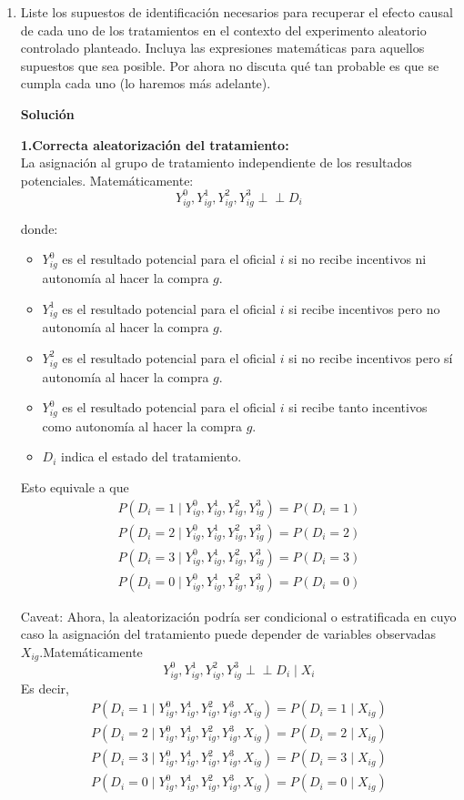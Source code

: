 \documentclass[a4paper, answers, addpoints, 11pt]{exam}
\newenvironment{solucion}{%
  \begin{mdframed}[
    backgroundcolor=blue!5,    %
    linecolor=blue!50,          %
    linewidth=2pt,              %
    leftmargin=10pt,            %
    rightmargin=10pt,           %
    topline=true,              %
    bottomline=true,            %
    roundcorner=10pt,           %
    innerleftmargin=10pt,       %
    innerrightmargin=10pt,      %
    innerbottommargin=10pt,     %
    innertopmargin=10pt         %
  ]%
  \begin{tcolorbox}[colframe=blue!50!black, colback=blue!50, coltitle=white, sharp corners=all, boxrule=1mm, width=\textwidth, halign=left, valign=center, top=0mm, bottom=0mm, left=0mm, right=0mm] \textbf{Solución} \end{tcolorbox} }{\end{mdframed}}
\begin{document}
\begin{enumerate}
    \item Liste los supuestos de identificación necesarios para recuperar el efecto causal de cada uno de los tratamientos en el contexto del experimento aleatorio controlado planteado. Incluya las expresiones matemáticas para aquellos supuestos que sea posible. Por ahora no discuta qué tan probable es que se cumpla cada uno (lo haremos más adelante). 
    \begin{solucion}
    \textbf{1.Correcta aleatorización del tratamiento:}\\
    La asignación al grupo de tratamiento independiente de los resultados potenciales. Matemáticamente:
   \[
Y_{ig}^0, Y_{ig}^1, Y_{ig}^2, Y_{ig}^3 \perp\!\!\!\perp D_i
\]

donde:
\begin{itemize}
    \item \( Y_{ig}^0 \) es el resultado potencial para el oficial \( i \) si no recibe incentivos ni autonomía al hacer la compra \( g \).
  \item \( Y_{ig}^1 \) es el resultado potencial para el oficial \( i \) si recibe incentivos pero no autonomía al hacer la compra \( g \).
  \item \( Y_{ig}^2 \) es el resultado potencial para el oficial \( i \) si no recibe incentivos pero sí autonomía al hacer la compra \( g \).
  \item \( Y_{ig}^0 \) es el resultado potencial para el oficial \( i \) si recibe tanto incentivos como autonomía al hacer la compra \( g \).
    \item \( D_i \) indica el estado del tratamiento.
\end{itemize}
Esto equivale a que \begin{gather*}
 P(D_i = 1 \mid Y_{ig}^0, Y_{ig}^1, Y_{ig}^2, Y_{ig}^3) = P(D_i = 1)\\
P(D_i = 2 \mid Y_{ig}^0, Y_{ig}^1, Y_{ig}^2, Y_{ig}^3) = P(D_i = 2)\\
P(D_i = 3 \mid Y_{ig}^0, Y_{ig}^1, Y_{ig}^2, Y_{ig}^3) = P(D_i = 3)\\
P(D_i = 0 \mid Y_{ig}^0, Y_{ig}^1, Y_{ig}^2, Y_{ig}^3) = P(D_i = 0)   
\end{gather*}

\begin{mdframed}[backgroundcolor=moraditoClaro]
Caveat: Ahora, la aleatorización podría ser condicional o estratificada en cuyo caso la asignación del tratamiento puede depender de variables observadas \(X_{ig}\).Matemáticamente \[
Y_{ig}^0, Y_{ig}^1, Y_{ig}^2, Y_{ig}^3 \perp\!\!\!\perp D_i \mid X_i
\]
Es decir,
\begin{gather*}
 P(D_i = 1 \mid Y_{ig}^0, Y_{ig}^1, Y_{ig}^2, Y_{ig}^3,X_{ig}) = P(D_i = 1\mid X_{ig})\\
P(D_i = 2 \mid Y_{ig}^0, Y_{ig}^1, Y_{ig}^2, Y_{ig}^3,X_{ig}) = P(D_i = 2\mid X_{ig})\\
P(D_i = 3 \mid Y_{ig}^0, Y_{ig}^1, Y_{ig}^2, Y_{ig}^3,X_{ig}) = P(D_i = 3\mid X_{ig})\\
P(D_i = 0 \mid Y_{ig}^0, Y_{ig}^1, Y_{ig}^2, Y_{ig}^3,X_{ig}) = P(D_i = 0\mid X_{ig})   
\end{gather*}


\end{mdframed}
\end{solucion}
\end{enumerate}
\end{document}
